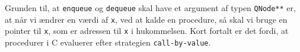 
Grunden til, at \verb+enqueue+ og \verb+dequeue+ skal have et argument af typen \verb+QNode**+ er,  
at når vi ændrer en værdi af \verb+x+, ved at kalde en procedure, så skal vi bruge en pointer til \verb+x+,
som er adressen til \verb+x+ i hukommelsen. Kort fortalt er det fordi, at procedurer i C evaluerer efter 
strategien \verb+call-by-value+.

